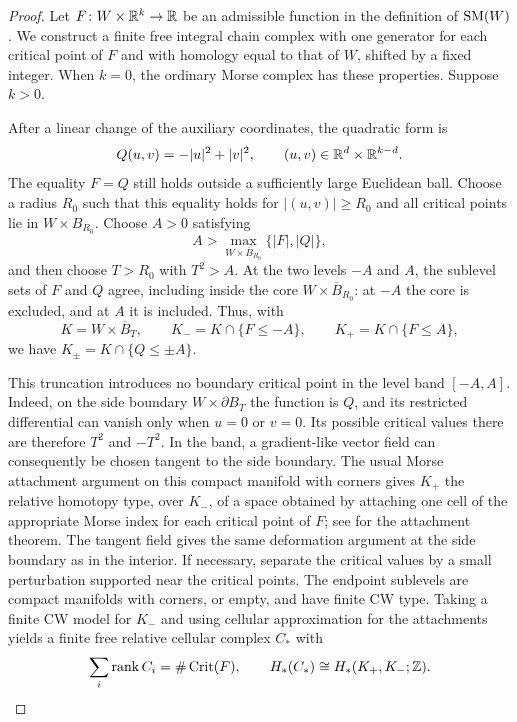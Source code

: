 \begin{proof}
Let $F\colon W\times\mathbb R^k\to\mathbb R$ be an admissible function in the definition
of $\operatorname{SM}(W)$.  We construct a finite free integral chain complex with one
generator for each critical point of $F$ and with homology equal to that of
$W$, shifted by a fixed integer.  When $k=0$, the ordinary Morse complex
has these properties.  Suppose $k>0$.

After a linear change of the auxiliary coordinates, the quadratic form is
\[
 Q(u,v)=-|u|^2+|v|^2,
 \qquad (u,v)\in\mathbb R^d\times\mathbb R^{k-d}.
\]
The equality $F=Q$ still holds outside a sufficiently large Euclidean ball.
Choose a radius $R_0$ such that this equality holds for $|(u,v)|\geq R_0$
and all critical points lie in $W\times B_{R_0}$.  Choose $A>0$ satisfying
\[
 A>\max_{W\times\overline B_{R_0}}\{|F|,|Q|\},
\]
and then choose $T>R_0$ with $T^2>A$.  At the two levels $-A$ and $A$,
the sublevel sets of $F$ and $Q$ agree, including inside the core
$W\times\overline B_{R_0}$: at $-A$ the core is excluded, and at $A$ it
is included.  Thus, with
\[
 K=W\times\overline B_T,\qquad
 K_-=K\cap\{F\leq-A\},\qquad
 K_+=K\cap\{F\leq A\},
\]
we have $K_\pm=K\cap\{Q\leq\pm A\}$.

This truncation introduces no boundary critical point in the level band
$[-A,A]$.  Indeed, on the side boundary $W\times\partial B_T$ the function
is $Q$, and its restricted differential can vanish only when $u=0$ or
$v=0$.  Its possible critical values there are therefore $T^2$ and $-T^2$.
In the band, a gradient-like vector field can consequently be chosen
tangent to the side boundary.  The usual Morse attachment argument on
this compact manifold with corners gives $K_+$ the relative homotopy type,
over $K_-$, of a space obtained by attaching one cell of the appropriate
Morse index for each critical point of $F$;
see \cite[Section~3]{Milnor1963} for the attachment theorem.
The tangent field gives the same deformation argument at the side
boundary as in the interior.  If necessary, separate the critical values
by a small perturbation supported near the critical points.  The endpoint
sublevels are compact manifolds with corners, or empty, and have finite
CW type.  Taking a finite CW model for $K_-$ and using cellular approximation for the
attachments yields a finite free relative cellular complex $C_*$ with
\begin{equation}\label{eq:critical-chain-rank}
 \sum_i\operatorname{rank} C_i=\#\operatorname{Crit}(F),\qquad
 H_*(C_*)\cong H_*(K_+,K_-;\mathbb Z).
\end{equation}


\end{proof}
